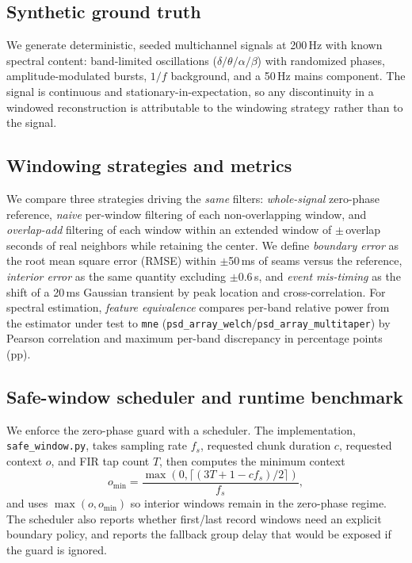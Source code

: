 \documentclass[conference]{IEEEtranSPMB}
\begin{document}
\subsection{Synthetic ground truth}
We generate deterministic, seeded multichannel signals at 200\,Hz with known spectral content:
band-limited oscillations ($\delta/\theta/\alpha/\beta$) with randomized phases,
amplitude-modulated bursts, $1/f$ background, and a 50\,Hz mains component. The signal is
continuous and stationary-in-expectation, so any discontinuity in a windowed reconstruction is
attributable to the windowing strategy rather than to the signal.

\subsection{Windowing strategies and metrics}
We compare three strategies driving the \emph{same} filters: \emph{whole-signal} zero-phase
reference, \emph{naive} per-window filtering of each non-overlapping window, and
\emph{overlap-add} filtering of each window within an extended window of $\pm$\,overlap seconds of
real neighbors while retaining the center. We define \emph{boundary error} as the root mean square
error (RMSE) within $\pm$50\,ms of seams versus the reference, \emph{interior error} as the same
quantity excluding $\pm$0.6\,s, and \emph{event mis-timing} as the shift of a 20\,ms Gaussian
transient by peak location and cross-correlation.
For spectral estimation, \emph{feature equivalence} compares per-band relative power from the
estimator under test to \texttt{mne} (\texttt{psd\_array\_welch}/\texttt{psd\_array\_multitaper})
by Pearson correlation and maximum per-band discrepancy in percentage points (pp).

\subsection{Safe-window scheduler and runtime benchmark}
We enforce the zero-phase guard with a scheduler. The implementation, \texttt{safe\_window.py},
takes sampling rate $f_s$, requested chunk duration $c$, requested context $o$, and FIR tap count
$T$, then computes the minimum context
\begin{equation}
o_{\min}=\frac{\max(0,\lceil(3T+1-cf_s)/2\rceil)}{f_s},
\label{eq:scheduler}
\end{equation}
and uses $\max(o,o_{\min})$ so interior windows remain in the zero-phase regime. The scheduler
also reports whether first/last record windows need an explicit boundary policy, and reports the
fallback group delay that would be exposed if the guard is ignored.
\end{document}
